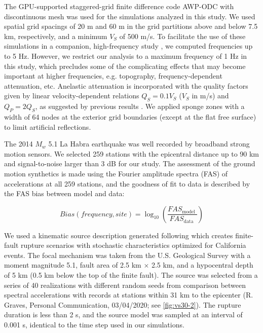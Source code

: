 The GPU-supported staggered-grid finite difference code AWP-ODC \citep[Anelastic Wave Propagation - Olsen, Day, and Cui, from the authors of the code;][]{cuiScalableEarthquakeSimulation2010} with discontinuous mesh \citep{nieFourthOrderStaggered2017} was used for the simulations analyzed in this study. We used spatial grid spacings of 20 m and 60 m in the grid partitions above and below 7.5 km, respectively, and a minimum $V_S$ of 500 m/s. To facilitate the use of these simulations in a companion, high-frequency study \citep{hu05HzDeterministic2021}, we computed frequencies up to 5 Hz. However, we restrict our analysis to a maximum frequency of 1 Hz in this study, which precludes some of the complicating effects that may become important at higher frequencies, e.g. topography, frequency-dependent attenuation, etc. 
Anelastic attenuation is incorporated with the quality factors given by linear velocity-dependent relations $Q_S=0.1V_S$ ($V_S$ in m/s) and $Q_P=2Q_S$, as suggested by previous results \citep{bielakShakeOutEarthquakeScenario2010,withersGroundMotionIntraevent2019}. We applied sponge zones \citep{cerjanNonreflectingBoundaryCondition1985} with a width of 64 nodes at the exterior grid boundaries (except at the flat free surface) to limit artificial reflections.

The 2014 $M_w$ 5.1 La Habra earthquake was well recorded by broadband strong motion sensors. We selected 259 stations with the epicentral distance up to 90 km and signal-to-noise larger than 3 dB for our study. The assessment of the ground motion synthetics is made using the Fourier amplitude spectra (FAS) of accelerations at all 259 stations, and the goodness of fit to data is described by the FAS bias between model and data:

\begin{equation}\label{eq:vs30-1}
  Bias(frequency, site)=\log_{10}\left(\frac{F A S_{\text {model }}}{F A S_{\text{data }}}\right)
\end{equation}

We used a kinematic source description generated following \citet{gravesKinematicGroundMotion2016} which creates finite-fault rupture scenarios with stochastic characteristics optimized for California events. The focal mechanism was taken from the U.S. Geological Survey \citep[strike=233$^\circ$, dip=77$^\circ$, rake=49$^\circ$;][]{usgsEarthquakeEventsFocal2014} with a moment magnitude 5.1, fault area of 2.5 km $\times$ 2.5 km, and a hypocentral depth of 5 km (0.5 km below the top of the finite fault). The source was selected from a series of 40 realizations with different random seeds from comparison between spectral accelerations with records at stations within 31 km to the epicenter (R. Graves, Personal Communication, 03/04/2020; see \cref{fig:vs30-2}). The rupture duration is less than 2 s, and the source model was sampled at an interval of 0.001 s, identical to the time step used in our simulations.

